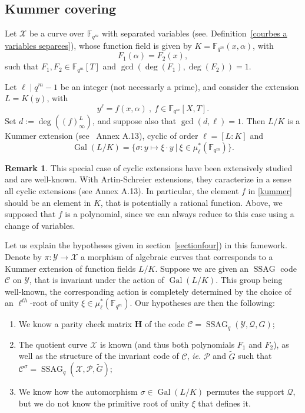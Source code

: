\documentclass[10pt]{article}
\theoremstyle{definition}
\newtheorem{rq1}[thm]{Remark}
\theoremstyle{definition}
\theoremstyle{definition}
\newcommand{\cd}{\cdot}
\newcommand{\Fqm}{\mathbb{F}_{q^m}}
\newcommand{\X}{\mathcal{X}}
\newcommand{\Y}{\mathcal{Y}}
\newcommand{\PR}{\mathcal{P}}
\newcommand{\QR}{\mathcal{Q}}
\newcommand{\Gal}{\operatorname{Gal}}
\newcommand{\ssag}{\operatorname{SSAG}}
\begin{document}
\subsection{Kummer covering} \label{sectionkummer}


Let $\X$ be a curve over $\Fqm$ with separated variables (see. Definition~\ref{courbes a variables separees}), whose function field is given by $K=\Fqm(x,\alpha)$, with
\[F_1(\alpha) = F_2(x),\] 
such that $F_1,F_2 \in \Fqm[T]$ and $\gcd(\deg(F_1),\deg(F_2))=1$. 

Let $\ell \mid q^m-1$ be an integer (not necessarly a prime), and consider the extension $L=K(y)$, with
\begin{equation} \label{kummer}
y^{\ell} = f(x,\alpha) \ , \ f \in \Fqm[X,T]. 
\end{equation}
Set $d:=\deg\left((f)^L_{\infty}\right)$, and suppose also that $\gcd(d,\ell)=1$. Then $L/K$ is a Kummer extension (see~\cite{Sti} Annex A.13), cyclic of order $\ell=[L:K]$ and 
\[\Gal(L/K) = \{ \sigma : y \mapsto \xi \cd y \ | \ \xi \in \mu^*_{\ell}(\Fqm)\}.\] 

\begin{rq1} \label{pk des polynomes}
This special case of cyclic extensions have been extensively studied and are well-known. With Artin-Schreier extensions, they caracterize in a sense all cyclic extensions (see \cite{Sti} Annex A.13). In particular, the element $f$ in \eqref{kummer} should be an element in $K$, that is potentially a rational function. Above, we supposed that $f$ is a polynomial, since we can always reduce to this case using a change of variables.
\end{rq1}

Let us explain the hypotheses given in section~\ref{sectionfour}) in this famework. Denote by $\pi : \Y \longrightarrow \X$ a morphism of algebraic curves that corresponds to a Kummer extension of function fields $L/K$. Suppose we are given an $\ssag$ code $\mathcal{C}$ on $\Y$, that is invariant under the action of $\Gal(L/K)$. This group being well-known, the corresponding action is completely determined by the choice of an $\ell^{th}$-root of unity $\xi \in \mu^*_{\ell}(\Fqm)$. Our hypotheses are then the following:

\begin{enumerate}
\item We know a parity check matrix $\mathbf{H}$ of the code $\mathcal{C} = \ssag_q(\Y,\QR,G)$;
\item The quotient curve $\X$ is known (and thus both polynomials $F_1$ and $F_2$), as well as the structure of the invariant code of $\mathcal{C}$, \textit{ie.} $\PR$ and $\tilde{G}$ such that $\mathcal{C}^{\sigma} = \ssag_q(\X,\PR,\tilde{G})$;
\item We know how the automorphism $\sigma \in \Gal(L/K)$ permutes the support $\QR$, but we do not know the primitive root of unity $\xi$ that defines it.
\end{enumerate}
\end{document}
